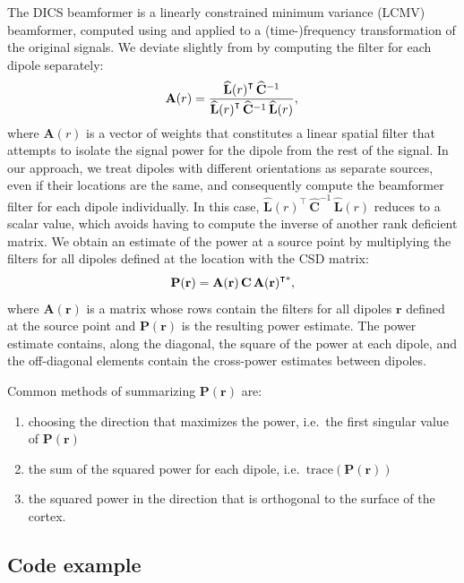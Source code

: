 \documentclass[utf8]{frontiersSCNS}
\newcommand{\textcite}[1]{\citet{#1}}
\newcommand{\bm}[1]{\mathbf{#1}}
\newcommand{\mat}[1]{\bm{#1}}
\renewcommand{\vec}[1]{\bm{#1}}
\newcommand{\trans}{^\intercal}
\begin{document}
The DICS beamformer is a linearly constrained minimum variance (LCMV) beamformer, computed using and applied to a (time-)frequency transformation of the original signals.
We deviate slightly from \textcite{Gross2001} by computing the filter for each dipole separately:
\begin{equation}\label{eq:filter}
    \vec{A}(r) = \frac{\widehat{\vec{L}}{(r)}\trans \, \widehat{\mat{C}}^{-1}}{\widehat{\vec{L}}{(r)}\trans \, \widehat{\mat{C}}^{-1} \, \widehat{\vec{L}}(r)}, \\
\end{equation}
where $\vec{A}(r)$ is a vector of weights that constitutes a linear spatial filter that attempts to isolate the signal power for the dipole from the rest of the signal.
In our approach, we treat dipoles with different orientations as separate sources, even if their locations are the same, and consequently compute the beamformer filter for each dipole individually.
In this case, $\hat{\vec{L}}(r)\trans \, \hat{\mat{C}}^{-1} \, \hat{\vec{L}}(r)$ reduces to a scalar value, which avoids having to compute the inverse of another rank deficient matrix.
We obtain an estimate of the power at a source point by multiplying the filters for all dipoles defined at the location with the CSD matrix:
\begin{equation}\label{eq:power}
    \mat{P}(\vec{r}) = \filter{\vec{r}}{\vec{r}},
\end{equation}
where $\mat{A}(\vec{r})$ is a matrix whose rows contain the filters for all dipoles $\vec{r}$ defined at the source point and $\mat{P}(\vec{r})$ is the resulting power estimate.
The power estimate contains, along the diagonal, the square of the power at each dipole, and the off-diagonal elements contain the cross-power estimates between dipoles.

Common methods of summarizing $\mat{P}(\vec{r})$ are:
\begin{enumerate}
    \item choosing the direction that maximizes the power, i.e.\ the first singular value of $\mat{P}(\vec{r})$
    \item the sum of the squared power for each dipole, i.e.\ $\text{trace}(\mat{P}(\vec{r}))$
    \item the squared power in the direction that is orthogonal to the surface of the cortex.
\end{enumerate}

\subsection{Code example}
\end{document}
